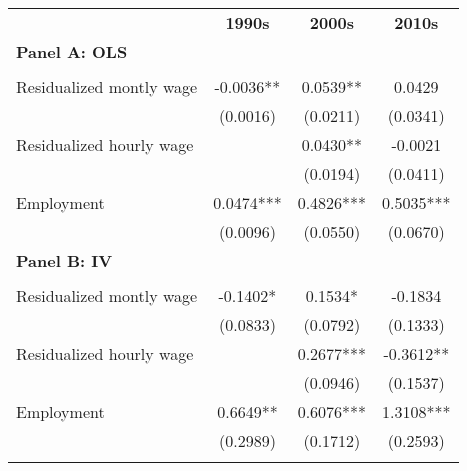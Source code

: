 \begin{tabular}{rccc}
\toprule
      & \multirow{2}[2]{*}{\textbf{1990s}} & \multirow{2}[2]{*}{\textbf{2000s}} & \multirow{2}[2]{*}{\textbf{2010s}} \\
      &       &       &  \\
\cmidrule{2-4}\multicolumn{1}{l}{\textbf{Panel A: OLS}} &       &       &  \\
      &       &       &  \\
\multicolumn{1}{l}{Residualized montly wage} & -0.0036** & 0.0539** & 0.0429 \\
      & (0.0016) & (0.0211) & (0.0341) \\
\multicolumn{1}{l}{Residualized hourly wage} &       & 0.0430** & -0.0021 \\
      &       & (0.0194) & (0.0411) \\
\multicolumn{1}{l}{Employment } & 0.0474*** & 0.4826*** & 0.5035*** \\
      & (0.0096) & (0.0550) & (0.0670) \\
\multicolumn{1}{l}{\textbf{Panel B: IV}} &       &       &  \\
      &       &       &  \\
\multicolumn{1}{l}{Residualized montly wage} & -0.1402* & 0.1534* & -0.1834 \\
      & (0.0833) & (0.0792) & (0.1333) \\
\multicolumn{1}{l}{Residualized hourly wage} &       & 0.2677*** & -0.3612** \\
      &       & (0.0946) & (0.1537) \\
\multicolumn{1}{l}{Employment } & 0.6649** & 0.6076*** & 1.3108*** \\
      & (0.2989) & (0.1712) & (0.2593) \\
      &       &       &  \\
\bottomrule
\end{tabular}%
